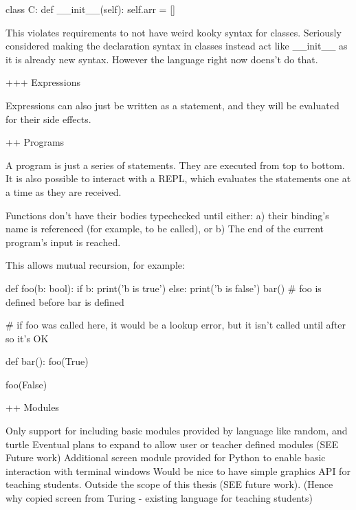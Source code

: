 class C:
    def __init__(self):
        self.arr = []

This violates requirements to not have weird kooky syntax for classes. Seriously considered making
the declaration syntax in classes instead act like __init__ as it is already new syntax. However
the language right now doens't do that.

+++ Expressions

Expressions can also just be written as a statement, and they will be evaluated for their side effects.

++ Programs

A program is just a series of statements. They are executed from top to bottom. It is also possible to interact with a REPL, which evaluates the statements one at a time as they are received.

Functions don't have their bodies typechecked until either:
a) their binding's name is referenced (for example, to be called), or
b) The end of the current program's input is reached.

This allows mutual recursion, for example:

def foo(b: bool):
    if b:
        print('b is true')
    else:
        print('b is false')
        bar() # foo is defined before bar is defined

# if foo was called here, it would be a lookup error, but it isn't called until after so it's OK

def bar():
    foo(True)

foo(False)

++ Modules

Only support for including basic modules provided by language like random, and turtle
Eventual plans to expand to allow user or teacher defined modules (SEE Future work)
Additional screen module provided for Python to enable basic interaction with terminal windows
Would be nice to have simple graphics API for teaching students. Outside the scope of this thesis (SEE future work).
(Hence why copied screen from Turing - existing language for teaching students)


















